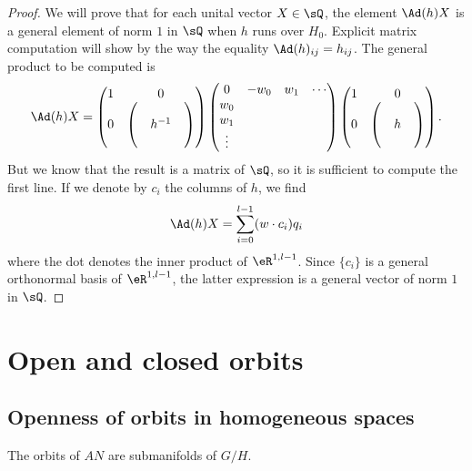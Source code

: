 \begin{proof}
We will prove that for each unital vector $X\in\sQ$, the element $\Ad(h)X$ is a general element of norm $1$ in $\sQ$ when $h$ runs over $H_0$. Explicit matrix computation will show by the way the equality  $\Ad(h)_{ij}=h_{ij}$. The general product to be computed is
\[ 
\Ad(h)X=
  \begin{pmatrix}
1	&	0\\
0	&
\begin{pmatrix}
&&\\
&h^{-1}\\
&&
\end{pmatrix}
\end{pmatrix}
\begin{pmatrix}
0&-w_0&w_1&\cdots\\
w_0\\
w_1\\
\vdots
\end{pmatrix}
  \begin{pmatrix}
1	&	0\\
0	&
\begin{pmatrix}
&&\\
&h\\
&&
\end{pmatrix}
\end{pmatrix}.
\]
But we know that the result is a matrix of $\sQ$, so it is sufficient to compute the first line. If we denote by $c_i$ the columns of $h$, we find
\[ 
  \Ad(h)X=\sum_{i=0}^{l-1}(w\cdot c_i)q_i
\]
where the dot denotes the inner product of $\eR^{1,l-1}$. Since $\{ c_i \}$ is a general orthonormal basis of $\eR^{1,l-1}$, the latter expression is a general vector of norm $1$ in $\sQ$.
\end{proof}



\section{Open and closed orbits}

\subsection{Openness of orbits in homogeneous spaces} \label{subsec:question}

\begin{proposition}
The orbits of $AN$ are submanifolds of $G/H$.
\label{pg:orbit_ssvar}
\end{proposition}

